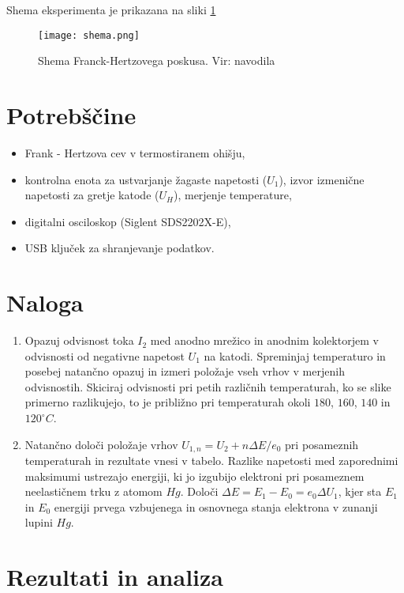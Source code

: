 \documentclass[10pt]{article}
\begin{document}
Shema eksperimenta je prikazana na sliki \ref{shema}

\begin{figure}[h]
\begin{center}
    \texttt{[image: shema.png]}
    \caption{Shema Franck-Hertzovega poskusa. Vir: navodila}
    \label{shema}
\end{center}
\end{figure}

\section{Potrebščine}

\begin{itemize}
    \item Frank - Hertzova cev v termostiranem ohišju,
    \item kontrolna enota za ustvarjanje žagaste napetosti ($U_1$), izvor izmenične napetosti za gretje katode ($U_H$), merjenje temperature,
    \item digitalni osciloskop (Siglent SDS2202X-E),
    \item USB ključek za shranjevanje podatkov.
\end{itemize}

\section{Naloga}

\begin{enumerate}
    \item Opazuj odvisnost toka $I_2$ med anodno mrežico in anodnim kolektorjem v odvisnosti od negativne napetost $U_1$ na katodi. Spreminjaj temperaturo in posebej natančno opazuj in izmeri položaje vseh vrhov v merjenih odvisnostih. Skiciraj odvisnosti pri petih različnih temperaturah, ko se slike primerno razlikujejo, to je približno pri temperaturah okoli $180$, $160$, $140$ in $120^{\circ}C$.
    \item Natančno določi položaje vrhov $U_{1,n} = U_2 + n\Delta E/e_0$ pri posameznih temperaturah in rezultate vnesi v tabelo. Razlike napetosti med zaporednimi maksimumi ustrezajo energiji, ki jo izgubijo elektroni pri posameznem neelastičnem trku z atomom $Hg$. Določi $\Delta E = E_1 - E_0 = e_0 \Delta U_1$, kjer sta $E_1$ in $E_0$ energiji prvega vzbujenega in osnovnega stanja elektrona v zunanji lupini $Hg$.
\end{enumerate}

\section{Rezultati in analiza}
\end{document}
